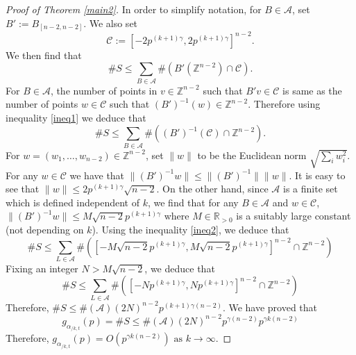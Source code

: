 \documentclass[a4paper]{amsart}
\numberwithin{equation}{section}
\theoremstyle{remark}
\newtheorem{remark}[theorem]{Remark}
\newcommand{\Z}{\mathbb{Z}}
\begin{document}
\begin{proof}[Proof of Theorem \ref{main2}]
\par In order to simplify notation, for $B\in \mathcal{A}$, set $B':=B_{[n-2, n-2]}$. We also set
\[\mathcal{C}:=[-2p^{(k+1)\gamma},2p^{(k+1)\gamma}]^{n-2}.\]
We then find that
\begin{equation}\label{ineq1}
    \#S \leq \sum_{B \in \mathcal{A}}\#\left(B'(\Z^{n-2})\cap \mathcal{C}\right).
\end{equation}
For $B \in \mathcal{A}$, the number of points in $v \in \Z^{n-2}$ such that $B'v \in \mathcal{C}$ is same as the number of points $w \in \mathcal{C}$ such that $\left(B'\right)^{-1}(w) \in \Z^{n-2}$. Therefore using inequality \ref{ineq1} we deduce that
\begin{equation}\label{ineq2}
    \#S \leq \sum_{B\in \mathcal{A}}\#(\left(B'\right)^{-1}(\mathcal{C})\cap \Z^{n-2}).
\end{equation}
For $w=(w_1, \dots, w_{n-2})\in \Z^{n-2}$, set $\lVert w \rVert$ to be the Euclidean norm $\sqrt{\sum_i w_i^2}$. For any $w \in \mathcal{C}$ we have that $\lVert (B')^{-1}w \rVert \leq \lVert (B')^{-1} \rVert\lVert w \rVert$. It is easy to see that $\lVert w \rVert \leq 2p^{(k+1)\gamma}\sqrt{n-2}$. On the other hand, since $\mathcal{A}$ is a finite set which is defined independent of $k$, we find that for any $B \in \mathcal{A}$ and $w \in \mathcal{C}$, $\lVert (B')^{-1}w \rVert \leq M\sqrt{n-2}p^{(k+1)\gamma}$ where $M \in \mathbb{R}_{>0}$ is a suitably large constant (not depending on $k$). Using the inequality \eqref{ineq2}, we deduce that
\begin{equation}\label{ineq3}
    \#S \leq \sum_{L \in \mathcal{A}}\#([-M\sqrt{n-2}p^{(k+1)\gamma},M\sqrt{n-2}p^{(k+1)\gamma}]^{n-2}\cap \Z^{n-2})
\end{equation}
Fixing an integer $N > M\sqrt{n-2}$, we deduce that
\begin{equation}\label{ineq4}
    \#S \leq \sum_{L \in \mathcal{A}}\#([-Np^{(k+1)\gamma},Np^{(k+1)\gamma}]^{n-2}\cap \Z^{n-2})
\end{equation}
Therefore, $\#S \leq \#(\mathcal{A})(2N)^{n-2}p^{(k+1)\gamma {(n-2)}}$. We have proved that
\[g_{\alpha_{/k,t}}(p) =\#S \leq \#(\mathcal{A})(2N)^{n-2}p^{\gamma{(n-2)}}p^{\gamma k{(n-2)}}\]
Therefore, $g_{\alpha_{/k,t}}(p) = O(p^{\gamma k(n-2)})\text{ as }k \to \infty.$
\end{proof}


\end{document}
